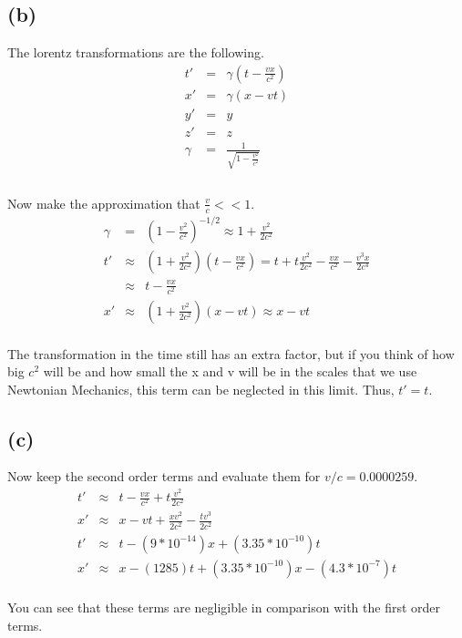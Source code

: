 \documentclass[11pt]{amsart}
\begin{document}
\subsection*{(b)} The lorentz transformations are the following. \\
\begin{eqnarray*} 
t' &=& \gamma(t-\frac{vx}{c^{2}}) \\
x' &=& \gamma(x-vt) \\
y' &=& y \\
z' &=& z \\
\gamma &=& \frac{1}{\sqrt{1-\frac{v^{2}}{c^{2}}}} \\
\end{eqnarray*} \\
Now make the approximation that $\frac{v}{c}<<1$. \\
\begin{eqnarray*} 
\gamma &=& (1-\frac{v^{2}}{c^{2}})^{-1/2} \approx 1+\frac{v^{2}}{2c^{2}} \\
t' &\approx& (1+\frac{v^{2}}{2c^{2}})(t-\frac{vx}{c^{2}}) = t+t\frac{v^{2}}{2c^{2}}-\frac{vx}{c^{2}}-\frac{v^{3}x}{2c^{4}} \\
&\approx& t-\frac{vx}{c^{2}} \\
x' &\approx& (1+\frac{v^{2}}{2c^{2}})(x-vt) \approx x-vt 
\end{eqnarray*} \\
The transformation in the time still has an extra factor, but if you think of how big $c^{2}$ will be and how small the x and v will be in the scales that we use Newtonian Mechanics, this term can be neglected in this limit. Thus, $t'=t$. \\
\subsection{(c)} Now keep the second order terms and evaluate them for $v/c = 0.0000259$. \\
\begin{eqnarray*} 
t' &\approx& t -\frac{vx}{c^{2}}+t\frac{v^{2}}{2c^{2}} \\
x' &\approx& x-vt+\frac{xv^{2}}{2c^{2}}-\frac{tv^{3}}{2c^{2}} \\
t' &\approx& t-(9*10^{-14})x+(3.35*10^{-10})t \\
x' &\approx& x-(1285)t+(3.35*10^{-10})x-(4.3*10^{-7})t
\end{eqnarray*} \\
You can see that these terms are negligible in comparison with the first order terms. \\
\end{document}

